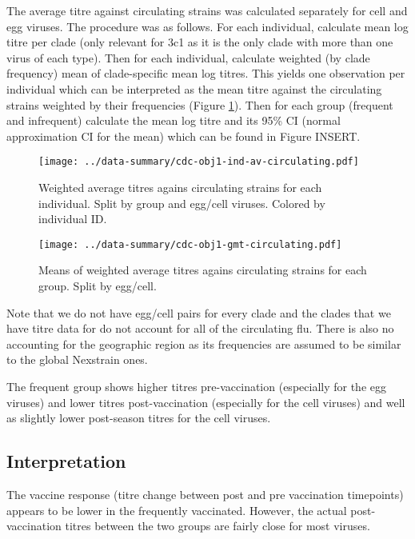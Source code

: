 \documentclass[12pt]{article}
\begin{document}


The average titre against circulating strains was calculated separately for cell and egg viruses. The procedure was as follows. For each individual, calculate mean log titre per clade (only relevant for 3c1 as it is the only clade with more than one virus of each type). Then for each individual, calculate weighted (by clade frequency) mean of clade-specific mean log titres. This yields one observation per individual which can be interpreted as the mean titre against the circulating strains weighted by their frequencies (Figure \ref{fig:cdc-obj1-ind-av-circulating}). Then for each group (frequent and infrequent) calculate the mean log titre and its 95\% CI (normal approximation CI for the mean) which can be found in Figure INSERT.

\begin{figure}
	\texttt{[image: ../data-summary/cdc-obj1-ind-av-circulating.pdf]}
	\caption{Weighted average titres agains circulating strains for each individual. Split by group and egg/cell viruses. Colored by individual ID.}
	\label{fig:cdc-obj1-ind-av-circulating}
\end{figure}

\begin{figure}
	\texttt{[image: ../data-summary/cdc-obj1-gmt-circulating.pdf]}
	\caption{Means of weighted average titres agains circulating strains for each group. Split by egg/cell.}
	\label{fig:cdc-obj1-gmt-circulating}
\end{figure}

Note that we do not have egg/cell pairs for every clade and the clades that we have titre data for do not account for all of the circulating flu. There is also no accounting for the geographic region as its frequencies are assumed to be similar to the global Nexstrain ones.

The frequent group shows higher titres pre-vaccination (especially for the egg viruses) and lower titres post-vaccination (especially for the cell viruses) and well as slightly lower post-season titres for the cell viruses.

\subsection{Interpretation}

The vaccine response (titre change between post and pre vaccination timepoints)
appears to be lower in the frequently vaccinated. However, the actual
post-vaccination titres between the two groups are fairly close for most viruses.
\end{document}
